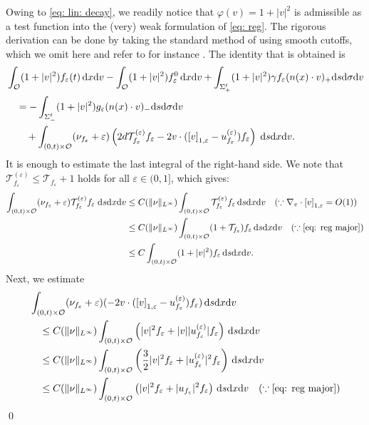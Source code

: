 \documentclass[10pt, reqno]{amsart}
\theoremstyle{plain}
\theoremstyle{definition}
\theoremstyle{remark}
\renewenvironment{proof}[1][\proofname]{\noindent{\scshape #1.\quad}}{\qed}
\numberwithin{equation}{section}
\newcommand{\calO}{\mathcal O}
\newcommand{\calT}{\mathcal T}
\newcommand{\ve}{\varepsilon}
\newcommand{\dx}{\textnormal{d}x}
\newcommand{\dv}{\textnormal{d}v}
\newcommand{\ds}{\textnormal{d}s}
\newcommand{\tnd}{\textnormal{d}}
\newcommand{\lt}{\left}
\newcommand{\rt}{\right}
\newcommand{\renorm}[3]{\lt[#1\rt]_{#2 , #3}}
\begin{document}
\begin{proof}
Owing to \eqref{eq: lin: decay}, we readily notice that $\varphi(v)=1+|v|^2$ is admissible as a test function into the (very) weak formulation of \eqref{eq: reg}. The rigorous derivation can be done by taking the standard method of using smooth cutoffs, which we omit here and refer to for instance \cite{Abdallah1994}. The identity that is obtained is
\begin{equation}\label{eq: energy est}
\begin{split}
    &\int_{\calO} (1+|v|^2) f_\ve(t) \,\dx\dv - \int_{\calO} (1+|v|^2) f_\ve^0 \,\dx\dv + \int_{\Sigma_+^t} (1+|v|^2) \gamma f_\ve (n(x)\cdot v)_+ \ds\tnd\sigma\dv \\
    &\quad= - \int_{\Sigma_-^t} (1+|v|^2) g_\ve (n(x)\cdot v)_- \ds\tnd\sigma\dv\\
    &\qquad + \int_{(0,t)\times \calO} (\nu_{f_\ve} + \ve) \lt(2 d \calT_{f_\ve}^{(\ve)} f_\ve - 2 v \cdot (\renorm{v}{1}{\ve} - u_{f_\ve}^{(\ve)}) f_\ve \rt) \; \ds\dx\dv.
\end{split}
\end{equation}
It is enough to estimate the last integral of the right-hand side. We note that $\calT_{f_\ve}^{(\ve)} \le \calT_{f_\ve} + 1$ holds for all $\ve\in (0,1]$, which gives:
\begin{align*}
    \int_{(0,t)\times \calO} (\nu_{f_\ve} + \ve) \calT_{f_\ve}^{(\ve)} f_\ve  \;\ds\dx\dv &\le C(\|\nu\|_{L^\infty}) \int_{(0,t)\times \calO} \calT_{f_\ve}^{(\ve)} f_\ve \,\ds\dx\dv \quad (\because \nabla_v\cdot \renorm{v}{1}{\ve} = O(1) ) \\
    &\le C(\|\nu\|_{L^\infty}) \int_{(0,t)\times \calO} (1 + \calT_{f_\ve}) f_\ve \,\ds\dx\dv \quad (\because \eqref{eq: reg major}) \\
    &\le C \int_{(0,t)\times \calO} (1 + |v|^2) f_\ve \,\ds\dx\dv.
\end{align*}
Next, we estimate
\begin{align*}
    &\int_{(0,t)\times \calO} (\nu_{f_\ve} + \ve) (-2v\cdot (\renorm{v}{1}{\ve} -u_{f_\ve}^{(\ve)}) f_\ve) \,\ds\dx\dv\\
    &\quad \le C(\|\nu\|_{L^\infty}) \int_{(0,t)\times \calO} \lt( |v|^2 f_\ve + |v| |u_{f_\ve}^{(\ve)}| f_\ve \rt) \,\ds\dx\dv\\
    &\quad \le C(\|\nu\|_{L^\infty}) \int_{(0,t)\times \calO} \lt(\frac{3}{2}|v|^2 f_\ve + |u_{f_\ve}^{(\ve)}|^2 f_\ve \rt) \,\ds\dx\dv\\
    &\quad \le C(\|\nu\|_{L^\infty}) \int_{(0,t)\times \calO} \lt(|v|^2 f_\ve + |u_{f_\ve}|^2 f_\ve \rt) \,\ds\dx\dv \quad (\because \eqref{eq: reg major}) \\

\end{align*}
\end{proof}
\end{document}
